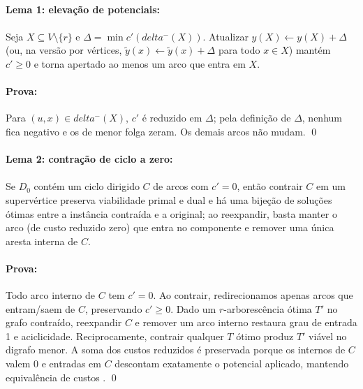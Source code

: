 \documentclass[12pt,a4paper]{article}
\def\emph#1{#1}%
\def\delta{delta}%
\begin{document}
\paragraph{Lema 1: elevação de potenciais:}
\paragraph{}

Seja \(X\subseteq V\setminus\{r\}\) e \(\Delta=\min c'(\delta^-(X))\). Atualizar \(y(X)\gets y(X)+\Delta\) (ou, na versão por vértices, \(\tilde y(x)\gets \tilde y(x)+\Delta\) para todo \(x\in X\)) mantém \(c'\ge 0\) e torna \emph{apertado} ao menos um arco que entra em \(X\).\newline

\paragraph{Prova:} Para \((u,x)\in \delta^-(X)\), \(c'\) é reduzido em \(\Delta\); pela definição de \(\Delta\), nenhum fica negativo e os de menor folga zeram. Os demais arcos não mudam. \qed

\paragraph{Lema 2: contração de ciclo a zero:}
\paragraph{}
Se \(D_0\) contém um ciclo dirigido \(C\) de arcos com \(c'=0\), então contrair \(C\) em um supervértice preserva viabilidade primal e dual e há uma bijeção de soluções ótimas entre a instância contraída e a original; ao reexpandir, basta manter o arco (de custo reduzido zero) que entra no componente e remover uma única aresta interna de \(C\).

\paragraph{Prova:} Todo arco interno de \(C\) tem \(c'=0\). Ao contrair, redirecionamos apenas arcos que entram/saem de \(C\), preservando \(c'\ge 0\). Dado um \(r\)-arborescência ótima \(T'\) no grafo contraído, reexpandir \(C\) e remover um arco interno restaura grau de entrada 1 e aciclicidade. Reciprocamente, contrair qualquer \(T\) ótimo produz \(T'\) viável no digrafo menor. A soma dos custos reduzidos é preservada porque os internos de \(C\) valem 0 e entradas em \(C\) descontam exatamente o potencial aplicado, mantendo equivalência de custos \cite[Sec.~4.9]{schrijver2003comb}. \qed
\end{document}
